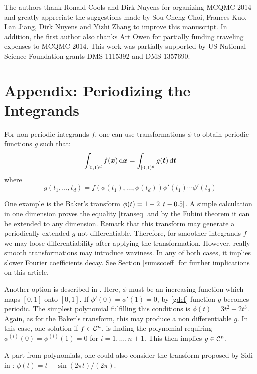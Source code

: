 \documentclass[graybox]{svmult}
\newcommand{\bst}{\boldsymbol{t}}    %
\newcommand{\bsx}{\boldsymbol{x}}    %
\begin{document}
\begin{acknowledgement}
The authors thank Ronald Cools and Dirk Nuyens for organizing MCQMC 2014 and greatly appreciate the suggestions made by Sou-Cheng Choi, Frances Kuo, Lan Jiang, Dirk Nuyens and Yizhi Zhang to improve this manuscript. In addition, the first author also thanks Art Owen for partially funding traveling expenses to MCQMC 2014.
This work was partially supported by US National Science Foundation grants DMS-1115392 and DMS-1357690. 
\end{acknowledgement}




\section*{Appendix: Periodizing the Integrands}\label{apendixperiodizing}
For non periodic integrands $f$, one can use transformations $\phi$ to obtain periodic functions $g$ such that:
\begin{equation}\label{transeq}
\int_{\cube} f(\bsx)  \, \dif \bsx=\int_{\cube} g(\bst)  \, \dif \bst
\end{equation}
where
\begin{equation}\label{gdef}
g(t_1,\dots,t_d)=f(\phi(t_1),\dots,\phi(t_d))\phi'(t_1)\cdots\phi'(t_d)
\end{equation}

One example is the Baker's transform $\phi(t)=1-2\left | t-0.5 \right |$. A simple calculation in one dimension proves the equality \eqref{transeq} and by the Fubini theorem it can be extended to any dimension. Remark that this transform may generate a periodically extended $g$ not differentiable. Therefore, for smoother integrands $f$ we may loose differentiability after applying the transformation. However, really smooth transformations may introduce waviness. In any of both cases, it implies slower Fourier coefficients decay. See Section \ref{sumscoeff} for further implications on this article.

Another option is described in \cite[Sec. 2.12]{SloJoe94}. Here, $\phi$ must be an increasing function which maps $[0,1]$ onto $[0,1]$. If $\phi'(0)=\phi'(1)=0$, by \eqref{gdef} function $g$ becomes periodic. The simplest polynomial fulfilling this conditions is $\phi(t)=3t^2-2t^3$. Again, as for the Baker's transform, this may produce a non differentiable $g$. In this case, one solution if $f\in\mathcal{C}^n$, is finding the polynomial requiring $\phi^{(i)}(0)=\phi^{(i)}(1)=0$ for $i=1,\dots,n+1$. This then implies $g\in\mathcal{C}^n$.

A part from polynomials, one could also consider the transform proposed by Sidi in \cite{Sid93}: $\phi(t)=t-\sin(2\pi t)/(2\pi)$.
\end{document}
